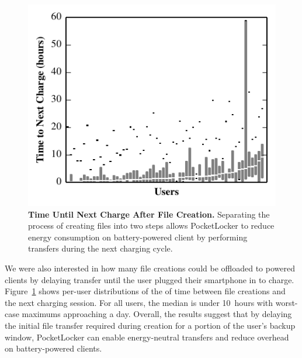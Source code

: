 \begin{figure}[t]

  \includegraphics[width=\columnwidth]{./figures/pocketlocker/BatteryLengthDistributionGraph.pdf}

  \caption{\small \textbf{Time Until Next Charge After File Creation.}
    Separating the process of creating files into two steps allows PocketLocker
    to reduce energy consumption on battery-powered client by performing
  transfers during the next charging cycle.}

  \label{fig-simulation-battery}

\end{figure}

We were also interested in how many file creations could be offloaded to
powered clients by delaying transfer until the user plugged their smartphone
in to charge. Figure~\ref{fig-simulation-battery} shows per-user
distributions of the of time between file creations and the next charging
session. For all users, the median is under 10~hours with worst-case maximums
approaching a day. Overall, the results suggest that by delaying the initial
file transfer required during creation for a portion of the user's backup
window, PocketLocker can enable energy-neutral transfers and reduce overhead
on battery-powered clients.

